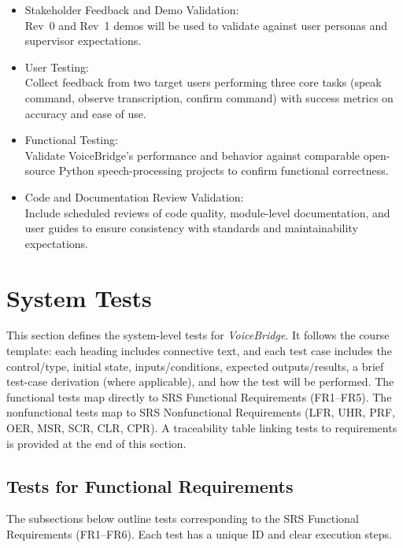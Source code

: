 \documentclass[12pt, titlepage]{article}
\begin{document}
\begin{itemize}
    \item Stakeholder Feedback and Demo Validation: \\
    Rev~0 and Rev~1 demos will be used to validate against user personas and supervisor expectations.

    \item User Testing: \\
    Collect feedback from two target users performing three core tasks (speak command, observe transcription, confirm command) with success metrics on accuracy and ease of use.

    \item Functional Testing: \\
    Validate VoiceBridge’s performance and behavior against comparable open-source Python speech-processing projects to confirm functional correctness.

     \item Code and Documentation Review Validation: \\ 
    Include scheduled reviews of code quality, module-level documentation, and user guides to ensure consistency with standards and maintainability expectations. 
  \end{itemize}


\section{System Tests}

This section defines the system-level tests for \emph{VoiceBridge}. It follows the course template: each heading includes connective text, and each test case includes the control/type, initial state, inputs/conditions, expected outputs/results, a brief test-case derivation (where applicable), and how the test will be performed. The functional tests map directly to SRS Functional Requirements (FR1–FR5). The nonfunctional tests map to SRS Nonfunctional Requirements (LFR, UHR, PRF, OER, MSR, SCR, CLR, CPR). A traceability table linking tests to requirements is provided at the end of this section.

\subsection{Tests for Functional Requirements}

The subsections below outline tests corresponding to the SRS Functional Requirements (FR1--FR6).
Each test has a unique ID and clear execution steps.
\end{document}
